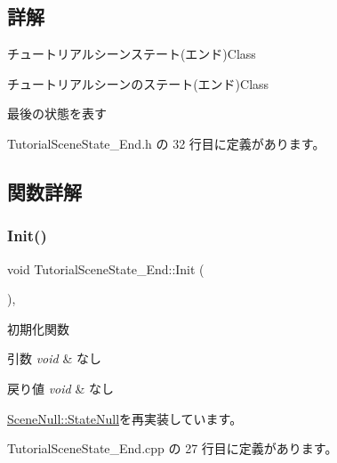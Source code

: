 \subsection{詳解}
チュートリアルシーンステート(エンド)Class 

チュートリアルシーンのステート(エンド)Class

最後の状態を表す 

 Tutorial\+Scene\+State\+\_\+\+End.\+h の 32 行目に定義があります。



\subsection{関数詳解}
\mbox{\label{class_tutorial_scene_state___end_a572e5687140ff5ac43789f90462c05a5}} 
\subsubsection{\texorpdfstring{Init()}{Init()}}
{\footnotesize\ttfamily void Tutorial\+Scene\+State\+\_\+\+End\+::\+Init (\begin{DoxyParamCaption}{ }\end{DoxyParamCaption})\hspace{0.3cm}{\ttfamily [override]}, {\ttfamily [virtual]}}



初期化関数 


\begin{DoxyParams}{引数}
{\em void} & なし \\
\hline
\end{DoxyParams}

\begin{DoxyRetVals}{戻り値}
{\em void} & なし \\
\hline
\end{DoxyRetVals}


\mbox{\hyperlink{class_scene_null_1_1_state_null_ac0b3f1adf01b580144337e37a847131f}{Scene\+Null\+::\+State\+Null}}を再実装しています。



 Tutorial\+Scene\+State\+\_\+\+End.\+cpp の 27 行目に定義があります。

\mbox{\label{class_tutorial_scene_state___end_a7cdf03fa9a0e41ab86c2b41b8165ad09}} 
